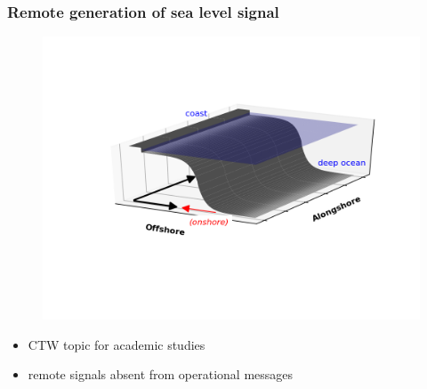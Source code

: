 \begin{frame}
\frametitle{Remote generation of sea level signal}
\begin{minipage}{0.45\textwidth}
    \begin{figure}      
    \includegraphics[width=\textwidth]{figures/diagrams/ctw_coords.png}\end{figure}
\end{minipage}
\hfill
\begin{minipage}{0.45\textwidth}
    \begin{itemize}
        \item CTW topic for academic studies
        \item remote signals absent from operational messages
    \end{itemize}
\end{minipage}
\end{frame}
